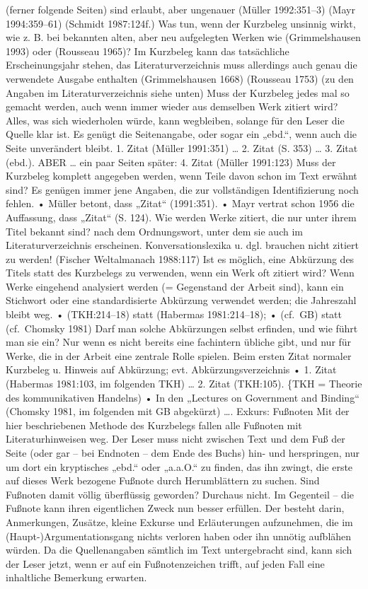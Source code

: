 \documentclass[]{book}
\theoremstyle{definition}
\theoremstyle{definition}
\theoremstyle{definition}
\theoremstyle{remark}
\begin{document}
(ferner folgende Seiten) sind erlaubt, aber ungenauer (Müller
1992:351--3) (Mayr 1994:359--61) (Schmidt 1987:124f.) Was tun, wenn der
Kurzbeleg unsinnig wirkt, wie z. B. bei bekannten alten, aber neu
aufgelegten Werken wie (Grimmelshausen 1993) oder (Rousseau 1965)? Im
Kurzbeleg kann das tatsächliche Erscheinungsjahr stehen, das
Literaturverzeichnis muss allerdings auch genau die verwendete Ausgabe
enthalten (Grimmelshausen 1668) (Rousseau 1753) (zu den Angaben im
Literaturverzeichnis siehe unten) Muss der Kurzbeleg jedes mal so
gemacht werden, auch wenn immer wieder aus demselben Werk zitiert wird?
Alles, was sich wiederholen würde, kann wegbleiben, solange für den
Leser die Quelle klar ist. Es genügt die Seitenangabe, oder sogar ein
„ebd.``, wenn auch die Seite unverändert bleibt. 1. Zitat (Müller
1991:351) \ldots{} 2. Zitat (S. 353) \ldots{} 3. Zitat (ebd.). ABER
\ldots{} ein paar Seiten später: 4. Zitat (Müller 1991:123) Muss der
Kurzbeleg komplett angegeben werden, wenn Teile davon schon im Text
erwähnt sind? Es genügen immer jene Angaben, die zur vollständigen
Identifizierung noch fehlen. • Müller betont, dass „Zitat`` (1991:351).
• Mayr vertrat schon 1956 die Auffassung, dass „Zitat`` (S. 124). Wie
werden Werke zitiert, die nur unter ihrem Titel bekannt sind? nach dem
Ordnungswort, unter dem sie auch im Literaturverzeichnis erscheinen.
Konversationslexika u. dgl. brauchen nicht zitiert zu werden! (Fischer
Weltalmanach 1988:117) Ist es möglich, eine Abkürzung des Titels statt
des Kurzbelegs zu verwenden, wenn ein Werk oft zitiert wird? Wenn Werke
eingehend analysiert werden (= Gegenstand der Arbeit sind), kann ein
Stichwort oder eine standardisierte Abkürzung verwendet werden; die
Jahreszahl bleibt weg. • (TKH:214--18) statt (Habermas 1981:214--18); •
(cf.~GB) statt (cf.~Chomsky 1981) Darf man solche Abkürzungen selbst
erfinden, und wie führt man sie ein? Nur wenn es nicht bereits eine
fachintern übliche gibt, und nur für Werke, die in der Arbeit eine
zentrale Rolle spielen. Beim ersten Zitat normaler Kurzbeleg u. Hinweis
auf Abkürzung; evt. Abkürzungsverzeichnis • 1. Zitat (Habermas 1981:103,
im folgenden TKH) \ldots{} 2. Zitat (TKH:105). \{TKH = Theorie des
kommunikativen Handelns) • In den „Lectures on Government and Binding``
(Chomsky 1981, im folgenden mit GB abgekürzt) \ldots{}. Exkurs: Fußnoten
Mit der hier beschriebenen Methode des Kurzbelegs fallen alle Fußnoten
mit Literaturhinweisen weg. Der Leser muss nicht zwischen Text und dem
Fuß der Seite (oder gar -- bei Endnoten -- dem Ende des Buchs) hin- und
herspringen, nur um dort ein kryptisches „ebd.`` oder „a.a.O.`` zu
finden, das ihn zwingt, die erste auf dieses Werk bezogene Fußnote durch
Herumblättern zu suchen. Sind Fußnoten damit völlig überflüssig
geworden? Durchaus nicht. Im Gegenteil -- die Fußnote kann ihren
eigentlichen Zweck nun besser erfüllen. Der besteht darin, Anmerkungen,
Zusätze, kleine Exkurse und Erläuterungen aufzunehmen, die im
(Haupt-)Argumentationsgang nichts verloren haben oder ihn unnötig
aufblähen würden. Da die Quellenangaben sämtlich im Text untergebracht
sind, kann sich der Leser jetzt, wenn er auf ein Fußnotenzeichen trifft,
auf jeden Fall eine inhaltliche Bemerkung erwarten.
\end{document}
